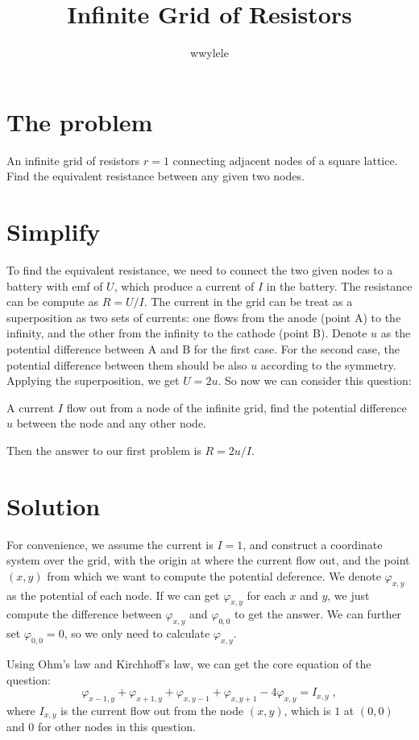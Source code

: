 \documentclass[10pt,a4paper,draft]{article}
\author{wwylele}
\title{Infinite Grid of Resistors}
\begin{document}
	\newtheorem{lemma}{Lemma}
	\newcommand{\ud}{\mathrm{d}}
	\newcommand{\sech}{\operatorname{sech}}
	\section{The problem}
	An infinite grid of resistors $r=1$ connecting adjacent nodes of a square lattice. Find the equivalent resistance between any given two nodes.
	
	\section{Simplify}
	To find the equivalent resistance, we need to connect the two given nodes to a battery with emf of $U$, which produce a current of $I$ in the battery. The resistance can be compute as $R=U/I$. The current in the grid can be treat as a superposition as two sets of currents: one flows from the anode (point A) to the infinity, and the other from the infinity to the cathode (point B). Denote $u$ as the potential difference between A and B for the first case. For the second case,  the potential difference between them should be also $u$ according to the symmetry. Applying the superposition, we get $U=2u$. So now we can consider this question:
	
	A current $I$ flow out from a node of the infinite grid, find the potential difference $u$  between the node and any other node.
	
	Then the answer to our first problem is $R=2u/I$.
	
	\section{Solution}
	For convenience, we assume the current is $I=1$, and construct a coordinate system over the grid, with the origin at where the current flow out, and the point $(x,y)$ from which we want to compute the potential deference. We denote $\varphi_{x,y}$ as the potential of each node. If we can get $\varphi_{x,y}$ for each $x$ and $y$, we just compute the difference between $\varphi_{x,y}$ and $\varphi_{0,0}$ to get the answer. We can further set $\varphi_{0,0} = 0$, so we only need to calculate $\varphi_{x,y}$.
	
	Using Ohm's law and Kirchhoff's law, we can get the core equation of the question:
	\begin{equation}
		\varphi_{x-1,y}+\varphi_{x+1,y}+\varphi_{x,y-1}+\varphi_{x,y+1}-4\varphi_{x,y}=I_{x,y}\;,
		\label{eqn:core}
	\end{equation}
	where $I_{x,y}$ is the current flow out from the node $(x,y)$, which is $1$ at $(0,0)$ and $0$ for other nodes in this question.
	
\end{document}
